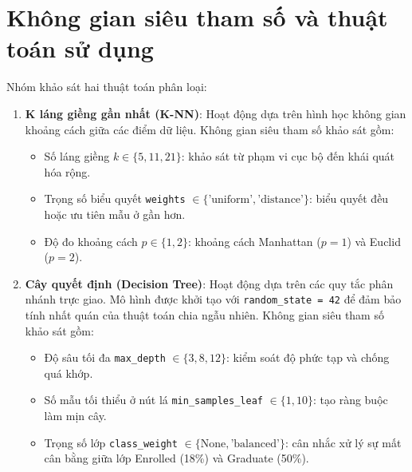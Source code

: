 \section{Không gian siêu tham số và thuật toán sử dụng}
Nhóm khảo sát hai thuật toán phân loại:
\begin{enumerate}
    \item \textbf{K láng giềng gần nhất (K-NN)}: Hoạt động dựa trên hình học không gian khoảng cách giữa các điểm dữ liệu. Không gian siêu tham số khảo sát gồm:
    \begin{itemize}
        \item Số láng giềng $k \in \{5, 11, 21\}$: khảo sát từ phạm vi cục bộ đến khái quát hóa rộng.
        \item Trọng số biểu quyết \texttt{weights} $\in \{\text{'uniform'}, \text{'distance'}\}$: biểu quyết đều hoặc ưu tiên mẫu ở gần hơn.
        \item Độ đo khoảng cách $p \in \{1, 2\}$: khoảng cách Manhattan ($p=1$) và Euclid ($p=2$).
    \end{itemize}
    \item \textbf{Cây quyết định (Decision Tree)}: Hoạt động dựa trên các quy tắc phân nhánh trực giao. Mô hình được khởi tạo với \texttt{random\_state = 42} để đảm bảo tính nhất quán của thuật toán chia ngẫu nhiên. Không gian siêu tham số khảo sát gồm:
    \begin{itemize}
        \item Độ sâu tối đa \texttt{max\_depth} $\in \{3, 8, 12\}$: kiểm soát độ phức tạp và chống quá khớp.
        \item Số mẫu tối thiểu ở nút lá \texttt{min\_samples\_leaf} $\in \{1, 10\}$: tạo ràng buộc làm mịn cây.
        \item Trọng số lớp \texttt{class\_weight} $\in \{\text{None}, \text{'balanced'}\}$: cân nhắc xử lý sự mất cân bằng giữa lớp Enrolled (18\%) và Graduate (50\%).
    \end{itemize}
\end{enumerate}

